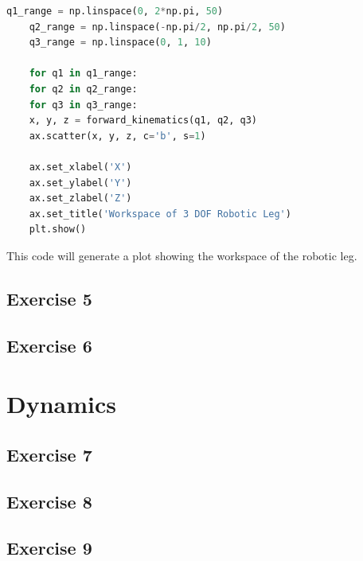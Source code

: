 \begin{solution}
\begin{lstlisting}[language=Python]
	q1_range = np.linspace(0, 2*np.pi, 50)
	q2_range = np.linspace(-np.pi/2, np.pi/2, 50)
	q3_range = np.linspace(0, 1, 10)
	
	for q1 in q1_range:
	for q2 in q2_range:
	for q3 in q3_range:
	x, y, z = forward_kinematics(q1, q2, q3)
	ax.scatter(x, y, z, c='b', s=1)
	
	ax.set_xlabel('X')
	ax.set_ylabel('Y')
	ax.set_zlabel('Z')
	ax.set_title('Workspace of 3 DOF Robotic Leg')
	plt.show()
	\end{lstlisting}
	
	This code will generate a plot showing the workspace of the robotic leg.
	
\end{solution}

\subsection{Exercise 5}
\lipsum[9]

\begin{solution}
    \lipsum[10]
\end{solution}

\subsection{Exercise 6}
\lipsum[11]

\begin{solution}
    \lipsum[12]
\end{solution}

\section{Dynamics}
\subsection{Exercise 7}
\lipsum[13]

\begin{solution}
    \lipsum[14]
\end{solution}

\subsection{Exercise 8}
\lipsum[15]

\begin{solution}
    \lipsum[16]
\end{solution}

\subsection{Exercise 9}
\lipsum[17]

\begin{solution}
    \lipsum[18]
\end{solution}

